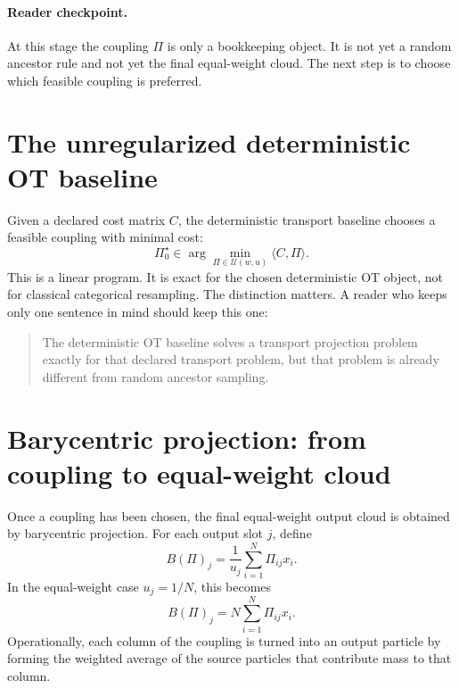 \paragraph{Reader checkpoint.}
At this stage the coupling \(\Pi\) is only a bookkeeping object.  It is not yet a
random ancestor rule and not yet the final equal-weight cloud.  The next step is
to choose which feasible coupling is preferred.

\section{The unregularized deterministic OT baseline}
\label{sec:bf-ot-baseline-unregularized}

Given a declared cost matrix \(C\), the deterministic transport baseline chooses a
feasible coupling with minimal cost:
\begin{equation}
\label{eq:bf-ot-baseline-lp}
  \Pi_0^\star
  \in
  \arg\min_{\Pi\in\mathcal U(w,u)}
  \langle C,\Pi\rangle.
\end{equation}
This is a linear program.  It is exact for the chosen deterministic OT object,
not for classical categorical resampling.  The distinction matters.  A reader who
keeps only one sentence in mind should keep this one:

\begin{quote}
The deterministic OT baseline solves a transport projection problem exactly for
that declared transport problem, but that problem is already different from
random ancestor sampling.
\end{quote}

\section{Barycentric projection: from coupling to equal-weight cloud}
\label{sec:bf-ot-baseline-barycentric}

Once a coupling has been chosen, the final equal-weight output cloud is obtained
by barycentric projection.  For each output slot \(j\), define
\begin{equation}
\label{eq:bf-ot-baseline-barycentric}
  B(\Pi)_j
  =
  \frac{1}{u_j}
  \sum_{i=1}^N \Pi_{ij}x_i.
\end{equation}
In the equal-weight case \(u_j=1/N\), this becomes
\begin{equation}
\label{eq:bf-ot-baseline-barycentric-equal}
  B(\Pi)_j
  =
  N\sum_{i=1}^N \Pi_{ij}x_i.
\end{equation}
Operationally, each column of the coupling is turned into an output particle by
forming the weighted average of the source particles that contribute mass to that
column.

